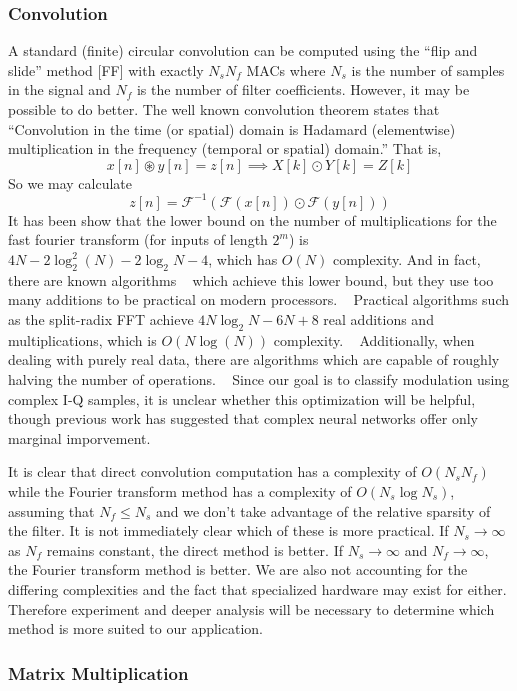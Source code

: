 \subsubsection{Convolution}
A standard (finite) circular convolution can be computed using the ``flip and slide'' method [FF] with exactly $N_s N_f$ MACs where $N_s$ is the number of samples in the signal and $N_f$ is the number of filter coefficients.  However, it may be possible to do better.
The well known convolution theorem states that ``Convolution in the time (or spatial) domain is Hadamard (elementwise) multiplication in the frequency (temporal or spatial) domain.''  That is,
$$ x[n]\circledast y[n] = z[n] \implies X[k] \odot Y[k] = Z[k]$$
So we may calculate
$$ z[n] = \mathcal{F}^{-1}(\mathcal{F}(x[n]) \odot \mathcal{F}(y[n]))$$
It has been show that the lower bound on the number of multiplications for the fast fourier transform (for inputs of length $2^m$) is $ 4N - 2\log_2^2(N) - 2\log_2N - 4$, which has $O(N)$ complexity.  And in fact, there are known algorithms ~\cite{Winograd} which achieve this lower bound, but they use too many additions to be practical on modern processors. ~\cite{Duhamel:1990:FFT:78772.78773}  Practical algorithms such as the split-radix FFT achieve $4N\log_2{N} - 6N + 8$ real additions and multiplications, which is $O(N\log(N))$ complexity. ~\cite{Yavne:1968:EMC:1476589.1476610}  Additionally, when dealing with purely real data, there are algorithms which are capable of roughly halving the number of operations. ~\cite{Bergland:1968:NAF:364096.364118} Since our goal is to classify modulation using complex I-Q samples, it is unclear whether this optimization will be helpful, though previous work has suggested that complex neural networks offer only marginal imporvement. ~\cite{DBLP:journals/corr/TrabelsiBSSSMRB17}

It is clear that direct convolution computation has a complexity of $O(N_sN_f)$ while the Fourier transform method has a complexity of $O(N_s\log N_s)$, assuming that $N_f \leq N_s$ and we don't take advantage of the relative sparsity of the filter.  It is not immediately clear which of these is more practical.  If $N_s \rightarrow \infty$ as $N_f$ remains constant, the direct method is better.  If $N_s \rightarrow \infty$ and $N_f \rightarrow \infty$, the Fourier transform method is better.  We are also not accounting for the differing complexities and the fact that specialized hardware may exist for either.  Therefore experiment and deeper analysis will be necessary to determine which method is more suited to our application.


\subsubsection{Matrix Multiplication}




